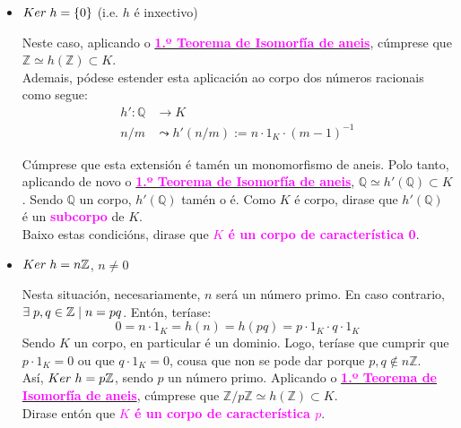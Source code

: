 \documentclass[twoside]{report}
\newcommand{\magbf}[1]{\textcolor{magenta}{\textbf{#1}}} %
\theoremstyle{mystyle}
\begin{document}
\begin{itemize}
    \item $Ker \hspace{1mm} h = \{0\}$ (i.e. $h$ é inxectivo)
    
    Neste caso, aplicando o \hyperref[th2.1]{\magbf{1.º Teorema de Isomorfía de aneis}}, cúmprese que $\mathbb{Z} \simeq h(\mathbb{Z}) \subset K$.\\
    Ademais, pódese estender esta aplicación ao corpo dos números racionais como segue:
    \begin{align*}
        h': \mathbb{Q} & \longrightarrow K\\
        n/m & \leadsto h'(n/m) := n \cdot 1_{K} \cdot (m - 1)^{-1}
    \end{align*} 
    
    Cúmprese que esta extensión é tamén un monomorfismo de aneis. Polo tanto, aplicando de novo o \hyperref[th2.1]{\magbf{1.º Teorema de Isomorfía de aneis}}, $\mathbb{Q} \simeq h'(\mathbb{Q}) \subset K$. Sendo $\mathbb{Q}$ un corpo, $h'(\mathbb{Q})$ tamén o é. Como $K$ é corpo, dirase que $h'(\mathbb{Q})$ é un \magbf{subcorpo} de $K$.\\
    
    Baixo estas condicións, dirase que \magbf{$K$ é un corpo de característica 0}.\\
    \item $Ker \hspace{1mm} h = n\mathbb{Z}$, $n \neq 0$
    
    Nesta situación, necesariamente, $n$ será un número primo. En caso contrario, $\exists \hspace{1mm} p,q \in \mathbb{Z} \hspace{1mm} | \hspace{1mm} n = pq$. Entón, teríase:
    $$0 = n \cdot 1_{K} = h(n) = h(pq) = p \cdot 1_{K} \cdot q \cdot 1_{K}$$
    Sendo $K$ un corpo, en particular é un dominio. Logo, teríase que cumprir que $p \cdot 1_{K} = 0$ ou que $q \cdot 1_{K} = 0$, cousa que non se pode dar porque $p,q \notin n\mathbb{Z}$.\\
    
    Así, $Ker \hspace{1mm} h = p\mathbb{Z}$, sendo $p$ un número primo. Aplicando o \hyperref[th2.1]{\magbf{1.º Teorema de Isomorfía de aneis}}, cúmprese que $\mathbb{Z}/p\mathbb{Z} \simeq h(\mathbb{Z}) \subset K$.\\
    
    Dirase entón que \magbf{$K$ é un corpo de característica $p$}.\\
\end{itemize}
\end{document}
